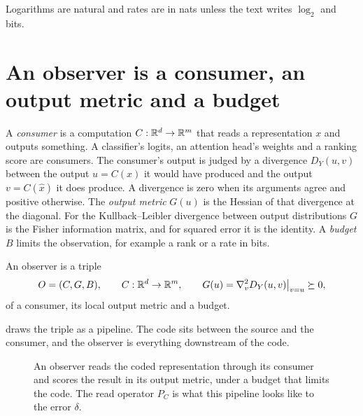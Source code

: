 Logarithms are natural and rates are in nats unless the text writes $\log_2$ and bits.

\section{An observer is a consumer, an output metric and a budget}\label{sec:ch06:observer}

A \emph{consumer} is a computation $C:\mathbb{R}^d\to\mathbb{R}^m$ that reads a representation $x$ and outputs something. A classifier's logits, an attention head's weights and a ranking score are consumers. The consumer's output is judged by a divergence $D_Y(u,v)$ between the output $u=C(x)$ it would have produced and the output $v=C(\hat x)$ it does produce. A divergence is zero when its arguments agree and positive otherwise. The \emph{output metric} $G(u)$ is the Hessian of that divergence at the diagonal. For the Kullback--Leibler divergence between output distributions $G$ is the Fisher information matrix, and for squared error it is the identity. A \emph{budget} $B$ limits the observation, for example a rank or a rate in bits.

\begin{definition}[Observer]\label{def:ch06:observer}
An observer is a triple
\begin{equation}\label{eq:ch06:triple}
O=(C,G,B),\qquad C:\mathbb{R}^d\to\mathbb{R}^m,\qquad G(u)=\nabla_v^2 D_Y(u,v)\big|_{v=u}\succeq 0,
\end{equation}
of a consumer, its local output metric and a budget.
\end{definition}

 draws the triple as a pipeline. The code sits between the source and the consumer, and the observer is everything downstream of the code.

\begin{figure}[tbp]\centering
{}
\caption{An observer reads the coded representation through its consumer and scores the result in its output metric, under a budget that limits the code. The read operator $P_C$ is what this pipeline looks like to the error $\delta$.}
\label{fig:ch06:observer}
\end{figure}

